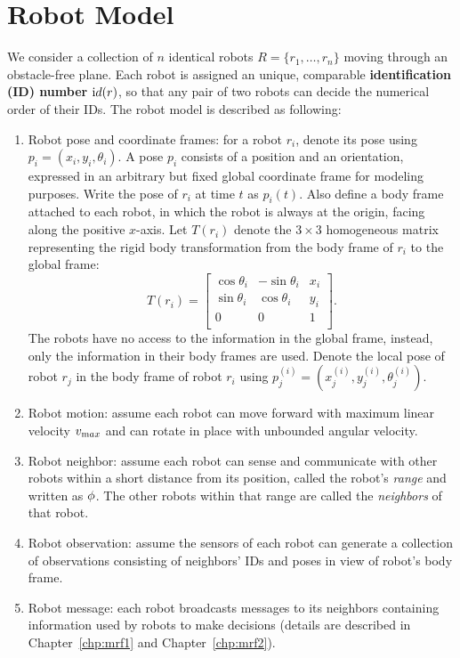 \section{Robot Model}
\label{sec:robot-model}
We consider a collection of $n$ identical robots $R = \{r_1, \ldots, r_n \}$ moving through an obstacle-free plane. 
%
Each robot is assigned an unique, comparable \textbf{identification (ID) number} ${\textrm id}(r)$, 
so that any pair of two robots can decide the numerical order of their IDs.
%
The robot model is described as following:
\begin{enumerate}
\item Robot pose and coordinate frames: for a robot $r_i$, denote its pose using
  $p_i = (x_i, y_i, \theta_i)$. A pose $p_i$ consists of a position and an
  orientation, expressed in an arbitrary but fixed global coordinate frame for
  modeling purposes. Write the pose of $r_i$ at time $t$ as $p_i(t)$.  Also
  define a body frame attached to each robot, in which the robot is always at
  the origin, facing along the positive $x$-axis.  Let $T(r_i)$ denote the $3
  \times 3$ homogeneous matrix representing the rigid body transformation from
  the body frame of $r_i$ to the global frame:
  \begin{equation}
    \label{eq:trans}
    T(r_i) =  \begin{bmatrix}
      \cos{\theta_i} & - \sin{\theta_i} & x_i\\
      \sin{\theta_i} & \cos{\theta_i} & y_i \\
      0 & 0 & 1\\
    \end{bmatrix}.
  \end{equation}
  The robots have no access to the information in the global frame,
  instead, only the information in their body frames are used. 
  Denote the local pose of robot $r_j$ in the body frame of robot $r_i$ using
  $p_j^{(i)} = (x_j^{(i)}, y_j^{(i)}, \theta_j^{(i)})$.
\item Robot motion: assume each robot can move forward with maximum
  linear velocity $v_{\textrm max}$ and can rotate in place with unbounded
  angular velocity.
\item Robot neighbor: assume each robot can sense and
  communicate with other robots within a short distance from its
  position, called the robot's \textit{range} and written as $\phi$.
  The other robots within that range are called the \textit{neighbors}
  of that robot.
\item Robot observation: assume the sensors of each robot can generate
  a collection of observations consisting of neighbors' IDs and poses
  in view of robot's body frame.
\item Robot message: each robot broadcasts messages to its neighbors
  containing information used by robots to make decisions (details are
  described in Chapter~\ref{chp:mrf1} and Chapter~\ref{chp:mrf2}). 
\end{enumerate}

